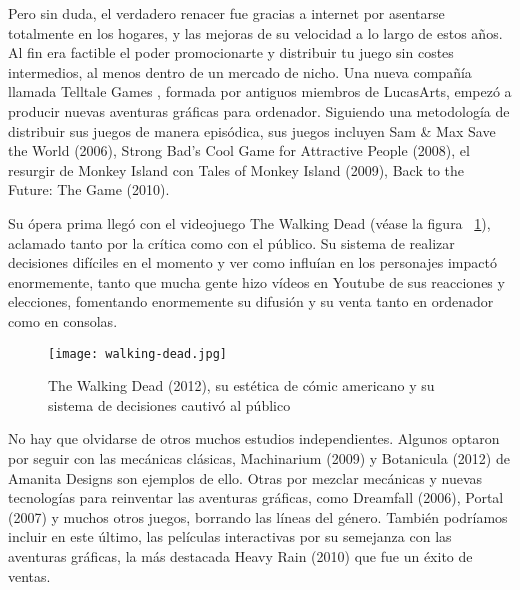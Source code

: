 Pero sin duda, el verdadero renacer fue gracias a internet por asentarse totalmente en los hogares, y las mejoras de su velocidad a lo largo de estos años. Al fin era factible el poder promocionarte y distribuir tu juego sin costes intermedios, al menos dentro de un mercado de nicho. Una nueva compañía llamada Telltale Games , formada por antiguos miembros de LucasArts, empezó a producir nuevas aventuras gráficas para ordenador. Siguiendo una metodología de distribuir sus juegos de manera episódica, sus juegos incluyen Sam \& Max Save the World  (2006), Strong Bad's Cool Game for Attractive People  (2008), el resurgir de Monkey Island con Tales of Monkey Island  (2009), Back to the Future: The Game  (2010).

Su ópera prima llegó con el videojuego The Walking Dead  (véase la figura ~\ref{fig:walking-dead}), aclamado tanto por la crítica como con el público. Su sistema de realizar decisiones difíciles en el momento y ver como influían en los personajes impactó enormemente, tanto que mucha gente hizo vídeos en Youtube de sus reacciones y elecciones, fomentando enormemente su difusión y su venta tanto en ordenador como en consolas.

\begin{figure}[H] 
  \begin{center}
    \texttt{[image: walking-dead.jpg]}
  \end{center}
  \caption{The Walking Dead (2012), su estética de cómic americano y su sistema de decisiones cautivó al público}
    \label{fig:walking-dead}
\end{figure}

No hay que olvidarse de otros muchos estudios independientes. Algunos optaron por seguir con las mecánicas clásicas, Machinarium  (2009) y Botanicula  (2012) de Amanita Designs son ejemplos de ello. Otras por mezclar mecánicas y nuevas tecnologías para reinventar las aventuras gráficas, como Dreamfall  (2006), Portal  (2007) y muchos otros juegos, borrando las líneas del género. También podríamos incluir en este último, las películas interactivas por su semejanza con las aventuras gráficas, la más destacada Heavy Rain  (2010) que fue un éxito de ventas.

